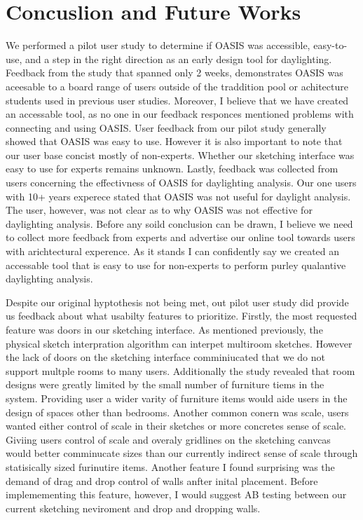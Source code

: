 \chapter{Concuslion and Future Works} \label{sec:results}

We performed a pilot user study to determine if OASIS was accessible, easy-to-use, and a step in the right direction as an early design tool for daylighting.
Feedback from the study that spanned only 2 weeks, demonstrates OASIS was aceesable to a board range of users outside of the traddition pool or achitecture students used in previous user studies.
Moreover, I believe that we have created an accessable tool, as no one in our feedback responces mentioned problems with connecting and using OASIS.
User feedback from our pilot study generally showed that OASIS was easy to use.
However it is also important to note that our user base concist mostly of non-experts. 
Whether our sketching interface was easy to use for experts remains unknown.
Lastly, feedback was collected from users concerning the effectivness of OASIS for daylighting analysis.
Our one users with 10+ years experece stated that OASIS was not useful for daylight analysis.
The user, however, was not clear as to why OASIS was not effective for daylighting analysis.
Before any soild conclusion can be drawn, I believe we need to collect more feedback from experts and advertise our online tool towards users with arichtectural experence.
As it stands I can confidently say we created an accessable tool that is easy to use for non-experts to perform purley qualantive daylighting analysis.

Despite our original hyptothesis not being met,
 out pilot user study did provide us feedback about what usabilty features to prioritize.
Firstly, the most requested feature was doors in our sketching interface.
As mentioned previously, the physical sketch interpration algorithm can interpet multiroom sketches.
However the lack of doors on the sketching interface comminiucated that we do not support multple rooms to many users.
Additionally the study revealed that room designs were greatly limited by the small number of furniture tiems in the system.
Providing user a wider varity of furniture items would aide users in the design of spaces other than bedrooms.
Another common conern was scale, users wanted either control of scale in their sketches or more concretes sense of scale.
Giviing users control of scale and overaly gridlines on the sketching canvcas would better comminucate sizes than our currently indirect sense of scale through statisically sized furinutire items.
Another feature I found surprising was the demand of drag and drop control of walls anfter inital placement.
Before implemementing this feature, however, I would suggest AB testing between our current sketching neviroment and drop and dropping walls.

